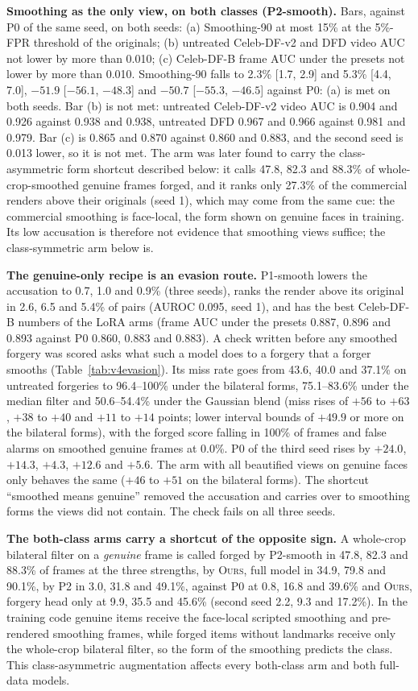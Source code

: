 \documentclass[10pt]{article}
\newcommand{\oursB}{\textsc{Ours}, forgery head only}
\newcommand{\oursF}{\textsc{Ours}, full model}
\begin{document}
\textbf{Smoothing as the only view, on both classes (P2-smooth).} Bars, against P0 of the same seed, on both seeds: (a)
Smoothing-90 at most 15\% at the 5\%-FPR threshold of the originals; (b) untreated Celeb-DF-v2 and DFD video AUC not lower by more
than 0.010; (c) Celeb-DF-B frame AUC under the presets not lower by more than 0.010. Smoothing-90 falls to 2.3\% [1.7, 2.9] and
5.3\% [4.4, 7.0], $-51.9$ [$-56.1$, $-48.3$] and $-50.7$ [$-55.3$, $-46.5$] against P0: (a) is met on both seeds. Bar (b) is not
met: untreated Celeb-DF-v2 video AUC is 0.904 and 0.926 against 0.938 and 0.938, untreated DFD 0.967 and 0.966 against 0.981 and
0.979. Bar (c) is 0.865 and 0.870 against 0.860 and 0.883, and the second seed is 0.013 lower, so it is not met. The arm was later
found to carry the class-asymmetric form shortcut described below: it calls 47.8, 82.3 and 88.3\% of whole-crop-smoothed genuine
frames forged, and it ranks only 27.3\% of the commercial renders above their originals (seed 1), which may come from the same cue:
the commercial smoothing is face-local, the form shown on genuine faces in training. Its low accusation is therefore not
evidence that smoothing views suffice; the class-symmetric arm below is.

\textbf{The genuine-only recipe is an evasion route.} P1-smooth lowers the accusation to 0.7, 1.0 and 0.9\% (three seeds), ranks the
render above its original in 2.6, 6.5 and 5.4\% of pairs (AUROC 0.095, seed 1), and has the best Celeb-DF-B numbers of the LoRA arms
(frame AUC under the presets 0.887, 0.896 and 0.893 against P0 0.860, 0.883 and 0.883). A check written before any smoothed forgery
was scored asks what such a model does to a forgery that a forger smooths (Table~\ref{tab:v4evasion}). Its miss rate goes from
43.6, 40.0 and 37.1\% on untreated forgeries to 96.4--100\% under the bilateral forms, 75.1--83.6\% under the median filter and
50.6--54.4\% under the Gaussian blend (miss rises of $+56$ to $+63$, $+38$ to $+40$ and $+11$ to $+14$ points; lower interval bounds
of $+49.9$ or more on the bilateral forms), with the forged score falling in 100\% of frames and false alarms on smoothed genuine
frames at 0.0\%. P0 of the third seed rises by $+24.0$, $+14.3$, $+4.3$, $+12.6$ and $+5.6$. The arm with all beautified views on
genuine faces only behaves the same ($+46$ to $+51$ on the bilateral forms). The shortcut ``smoothed means genuine'' removed the
accusation and carries over to smoothing forms the views did not contain. The check fails on all three seeds.

\textbf{The both-class arms carry a shortcut of the opposite sign.} A whole-crop bilateral filter on a \emph{genuine} frame is
called forged by P2-smooth in 47.8, 82.3 and 88.3\% of frames at the three strengths, by \oursF{} in 34.9, 79.8 and 90.1\%, by P2 in
3.0, 31.8 and 49.1\%, against P0 at 0.8, 16.8 and 39.6\% and \oursB{} at 9.9, 35.5 and 45.6\% (second seed 2.2, 9.3 and 17.2\%). In the training code
genuine items receive the face-local scripted smoothing and pre-rendered smoothing frames, while forged items without landmarks
receive only the whole-crop bilateral filter, so the form of the smoothing predicts the class. This class-asymmetric augmentation
affects every both-class arm and both full-data models.
\end{document}
